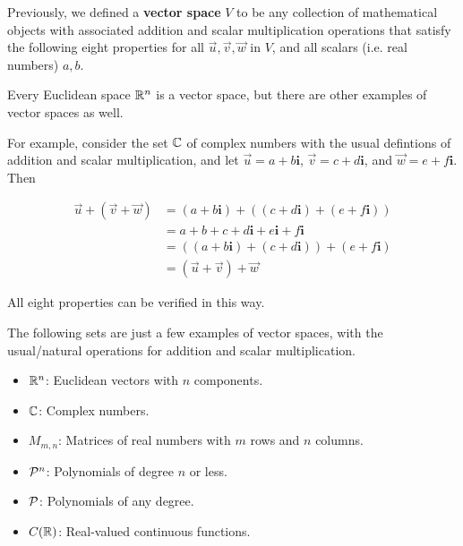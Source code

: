 \begin{applicationActivities}
\begin{remark}
  Previously, we defined a \textbf{vector space} \(V\) to be any collection of
  mathematical objects with
  associated addition and scalar multiplication operations that satisfy
  the following eight properties for all \(\vec u,\vec v,\vec w\) in \(V\),
  and all scalars (i.e. real numbers) \(a,b\).

  \vectorSpaceProperties
\end{remark}

\begin{remark}
  Every Euclidean space \(\IR^n\) is a vector space, but there are other
  examples of vector spaces as well. 

  \vspace{1em}
  
  For example, consider the
  set \(\IC\) of complex numbers with the usual defintions of
  addition and scalar multiplication, and let 
  \(\vec u=a+b\mathbf{i}\), \(\vec v=c+d\mathbf{i}\), and \(\vec w=e+f\mathbf{i}\). Then

  \begin{align*}
    \vec u+(\vec v+\vec w)
      &=
    (a+b\mathbf{i})+((c+d\mathbf{i})+(e+f\mathbf{i}))
      \\&=
    a+b+c+d\mathbf{i}+e\mathbf{i}+f\mathbf{i}
      \\&=
    ((a+b\mathbf{i})+(c+d\mathbf{i}))+(e+f\mathbf{i})
      \\&=
    (\vec u+\vec v)+\vec w
  \end{align*}

  All eight properties can be verified in this way.
\end{remark}

\begin{remark}
  The following sets are just a few examples of vector spaces, with the usual/natural
  operations for addition and scalar multiplication.
  \begin{itemize}
    \item \(\IR^n\): Euclidean vectors with \(n\) components.
    \item \(\IC\): Complex numbers.
    \item \(M_{m,n}\): Matrices of real numbers with \(m\) rows and
          \(n\) columns.
    \item \(\P^n\): Polynomials of degree \(n\) or less.
    \item \(\P\): Polynomials of any degree.
    \item \(C(\IR)\): Real-valued continuous functions.
  \end{itemize}
\end{remark}


\end{applicationActivities}
